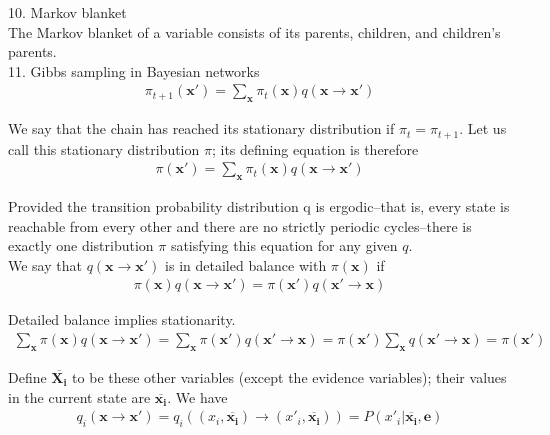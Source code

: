 \documentclass[12pt]{article}
\begin{document}
10. Markov blanket \\

The Markov blanket of a variable consists of its parents, children, and children's parents. \\

11. Gibbs sampling in Bayesian networks
\begin{eqnarray*}
\pi_{t+1}(\boldsymbol{x'})
= \sum_{\boldsymbol{x}} \pi_t(\boldsymbol{x}) q(\boldsymbol{x} 
  \rightarrow \boldsymbol{x'})
\end{eqnarray*}

We say that the chain has reached its stationary distribution if $\pi_t = \pi_{t+1}$. Let us call this stationary distribution $\pi$; its defining equation is therefore
\begin{eqnarray*}
\pi(\boldsymbol{x'})
= \sum_{\boldsymbol{x}} \pi_t(\boldsymbol{x}) q(\boldsymbol{x}
  \rightarrow \boldsymbol{x'})
\end{eqnarray*}

Provided the transition probability distribution q is ergodic--that is, every state is reachable from every other and there are no strictly periodic cycles--there is exactly one distribution $\pi$ satisfying this equation for any given $q$. \\

We say that $q(\boldsymbol{x} \rightarrow \boldsymbol{x'})$ is in detailed balance with $\pi(\boldsymbol{x})$ if 
\begin{eqnarray*}
\pi(\boldsymbol{x}) q(\boldsymbol{x} \rightarrow \boldsymbol{x'})
= \pi(\boldsymbol{x'}) q(\boldsymbol{x'} \rightarrow \boldsymbol{x})
\end{eqnarray*}

Detailed balance implies stationarity.
\begin{eqnarray*}
\sum_{\boldsymbol{x}} \pi(\boldsymbol{x}) q(\boldsymbol{x} \rightarrow \boldsymbol{x'}) = \sum_{\boldsymbol{x}} \pi(\boldsymbol{x'}) q(\boldsymbol{x'} \rightarrow \boldsymbol{x}) = \pi(\boldsymbol{x'}) \sum_{\boldsymbol{x}} q(\boldsymbol{x'} \rightarrow \boldsymbol{x}) =\pi(\boldsymbol{x'})
\end{eqnarray*}

Define $\overline{\boldsymbol{X_i}}$ to be these other variables (except the evidence variables); their values in the current state are $\overline{\boldsymbol{x_i}}$. We have
\begin{eqnarray*}
q_i(\boldsymbol{x} \rightarrow \boldsymbol{x'})
= q_i((x_i, \overline{\boldsymbol{x_i}}) \rightarrow 
  (x'_i, \overline{\boldsymbol{x_i}}))
= P(x'_i | \overline{\boldsymbol{x_i}}, \boldsymbol{e})
\end{eqnarray*}
\end{document}

